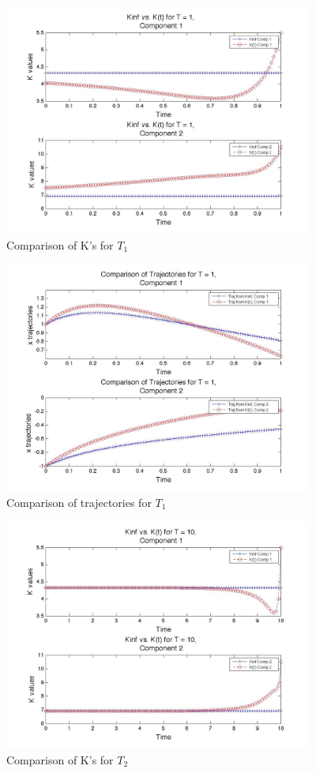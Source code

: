 \documentclass[12pt, notitlepage, letterpaper]{article}
\begin{document}
\begin{figure}[h]
\begin{center}
\includegraphics[width=4in]{KCompareT01}
\caption{Comparison of K's for $T_1$ }
\end{center}
\end{figure}

\begin{figure}[h]
\begin{center}
\includegraphics[width=4in]{xCompareT01}
\caption{Comparison of trajectories for $T_1$}
\end{center}
\end{figure}

\begin{figure}[h]
\begin{center}
\includegraphics[width=4in]{KCompareT10}
\caption{ Comparison of K's for $T_2$ }
\end{center}
\end{figure}
\end{document}
